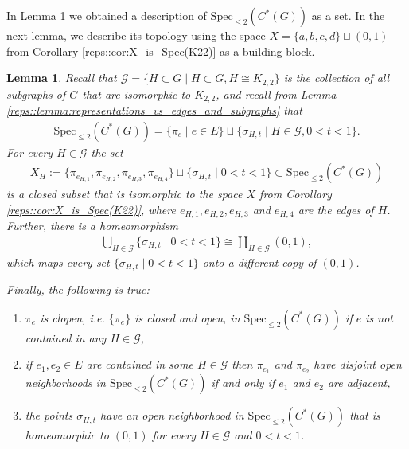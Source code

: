 \documentclass[a4paper]{amsart}
\newtheorem{lemma}[thm]{Lemma}
\begin{document}
In Lemma \ref{reps::lemma:Spec<=2(C*G)} we obtained a description of $\mathrm{Spec}_{\leq 2}(C^\ast(G))$ as a set. In the next lemma, we describe its topology using the space $X = \{a, b, c, d\} \sqcup (0,1)$ from Corollary \ref{reps::cor:X_is_Spec(K22)} as a building block.

\begin{lemma}
    \label{reps::lemma:Spec<=2(C*G)}
    Recall that $\mathcal{G} = \{H \subset G \mid H \subset G, H \cong K_{2,2}\}$ is the collection of all subgraphs of $G$ that are isomorphic to $K_{2,2}$, and recall from Lemma \ref{reps::lemma:representations_vs_edges_and_subgraphs} that
    \begin{align*}
        \mathrm{Spec}_{\leq 2}(C^\ast(G)) = \{\pi_e \mid e \in E\} \sqcup \{\sigma_{H,t} \mid H \in \mathcal{G}, 0 < t < 1\}.
    \end{align*}
    For every $H \in \mathcal{G}$ the set
    \begin{align*}
        X_H := \{\pi_{e_{H,1}}, \pi_{e_{H,2}}, \pi_{e_{H,3}}, \pi_{e_{H,4}}\} \sqcup \{\sigma_{H,t} \mid 0 < t < 1\} \subset \mathrm{Spec}_{\leq 2}(C^\ast(G))
    \end{align*}
    is a closed subset that is isomorphic to the space $X$ from Corollary \ref{reps::cor:X_is_Spec(K22)}, where $e_{H,1}, e_{H,2}, e_{H,3}$ and $e_{H,4}$ are the edges of $H$.
    Further, there is a homeomorphism
    \begin{align*}
        \bigcup_{H \in \mathcal{G}} \{\sigma_{H,t} \mid 0 < t < 1\} \cong \coprod_{H \in \mathcal{G}} (0,1),
    \end{align*}
    which maps every set $\{\sigma_{H,t} \mid 0 < t < 1\}$ onto a different copy of $(0,1)$.

    Finally, the following is true:
    \begin{enumerate}[label=(\alph*)]
        \item $\pi_e$ is clopen, i.e. $\{\pi_e\}$ is closed and open, in $\mathrm{Spec}_{\leq 2}(C^\ast(G))$ if $e$ is not contained in any $H \in \mathcal{G}$,
        \item if $e_1, e_2 \in E$ are contained in some $H \in \mathcal{G}$ then $\pi_{e_1}$ and $\pi_{e_2}$ have disjoint open neighborhoods in $\mathrm{Spec}_{\leq 2}(C^\ast(G))$ if and only if $e_1$ and $e_2$ are adjacent,
        \item the points $\sigma_{H,t}$ have an open neighborhood in $\mathrm{Spec}_{\leq 2}(C^\ast(G))$ that is homeomorphic to $(0,1)$ for every $H \in \mathcal{G}$ and $0 < t < 1$.
    \end{enumerate}
\end{lemma}
\end{document}
